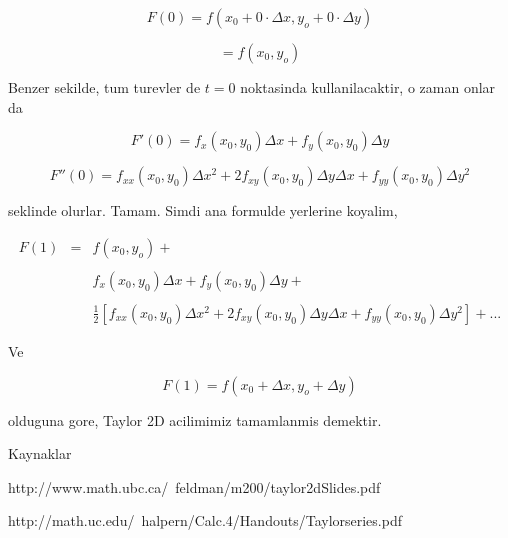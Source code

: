 \documentclass[12pt,fleqn]{article}
\begin{document}
\[ F(0) = f(x_0 + 0 \cdot \Delta x, y_o + 0 \cdot \Delta y) \]

\[ = f(x_0 , y_o) \]

Benzer sekilde, tum turevler de $t=0$ noktasinda kullanilacaktir, o zaman
onlar da

\[ F'(0) = f_x(x_0,y_0) \Delta x + f_y(x_0,y_0) \Delta y \]

\[ F''(0) =  
f_{xx}(x_0,y_0)\Delta x^2 + 2f_{xy}(x_0,y_0)\Delta y \Delta x + 
f_{yy}(x_0,y_0)\Delta y^2 
\]

seklinde olurlar. Tamam. Simdi ana formulde yerlerine koyalim,

\[ 
\begin{array}{lll}
F(1) &=& f(x_0 , y_o) +  \\ \\ 
&& f_x(x_0,y_0) \Delta x + f_y(x_0,y_0) \Delta y +   \\ \\
&& \frac{1}{2} 
[ 
f_{xx}(x_0,y_0)\Delta x^2 + 
2f_{xy}(x_0,y_0)\Delta y \Delta x +
f_{yy}(x_0,y_0)\Delta y^2 
] + ... 
\end{array}
 \]


Ve

\[ F(1) = f(x_0 +\Delta x, y_o + \Delta y) \]

olduguna gore, Taylor 2D acilimimiz tamamlanmis demektir. 

Kaynaklar 

http://www.math.ubc.ca/~feldman/m200/taylor2dSlides.pdf

http://math.uc.edu/~halpern/Calc.4/Handouts/Taylorseries.pdf
\end{document}
